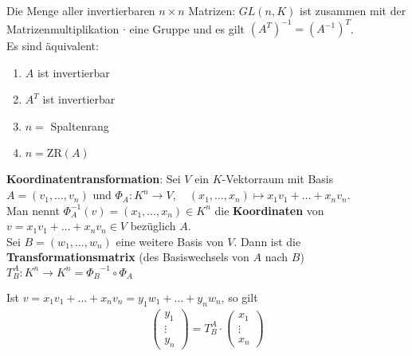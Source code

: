 Die Menge aller invertierbaren $n \times n$ Matrizen: $GL(n,K)$ ist zusammen mit der Matrizenmultiplikation $\cdot$ eine Gruppe und es gilt ${(A^T)}^{-1} = ({A}^{-1})^T$.\\
Es sind äquivalent:
\begin{enumerate}[{(}i{)}]
    \item $A$ ist invertierbar
                                         
    \item $A^T$ ist invertierbar
    
    \item $n =$ Spaltenrang
    
    \item $n = \text{ZR}(A)$
\end{enumerate}
\begin{mdframed}
\textbf{Koordinatentransformation}: \quad Sei $V$ ein $K$-Vektorraum mit Basis $A = (v_1, \ldots, v_n)$ und $\Phi_A: K^n \rightarrow V, \quad (x_1, \ldots, x_n) \mapsto x_{1} v_{1} + \ldots + x_{n} v_{n}$.\\
Man nennt $\Phi_A^{-1}(v) = (x_1, \ldots, x_n) \in K^n$ die \textbf{Koordinaten} von $v = x_{1} v_{1} + \ldots + x_{n} v_{n} \in V$ bezüglich $A$.\\
Sei $B = (w_1, \ldots, w_n)$ eine weitere Basis von $V$. Dann ist die \textbf{Transformationsmatrix} (des Basiswechsels von $A$ nach $B$) $T_{B}^{A}: K^n \rightarrow K^n = {\Phi_B}^{-1} \circ \Phi_A$
\begin{center}
\end{center}
Ist $v = x_{1} v_{1} + \ldots + x_{n} v_{n} = y_{1} w_{1} + \ldots + y_{n} w_{n}$, so gilt
\begin{align*}
    \begin{pmatrix}
    y_{1} \\ \vdots \\	 y_{n}
    \end{pmatrix} = T_{B}^{A} \cdot \begin{pmatrix}
    x_{1} \\ \vdots \\	 x_{n}
    \end{pmatrix}
\end{align*}
\end{mdframed}
